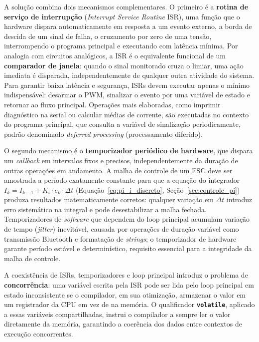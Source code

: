 A solução combina dois mecanismos complementares. O primeiro é a \textbf{rotina de serviço de interrupção} (\textit{Interrupt Service Routine} ISR), uma função que o hardware dispara automaticamente em resposta a um evento externo, a borda de descida de um sinal de falha, o cruzamento por zero de uma tensão, interrompendo o programa principal e executando com latência mínima. Por analogia com circuitos analógicos, a ISR é o equivalente funcional de um \textbf{comparador de janela}: quando o sinal monitorado cruza o limiar, uma ação imediata é disparada, independentemente de qualquer outra atividade do sistema. Para garantir baixa latência e segurança, ISRs devem executar apenas o mínimo indispensável: desarmar o PWM, sinalizar o evento por uma variável de estado e retornar ao fluxo principal. Operações mais elaboradas, como imprimir diagnóstico na serial ou calcular médias de corrente, são executadas no contexto do programa principal, que consulta a variável de sinalização periodicamente, padrão denominado \textit{deferred processing} (processamento diferido).

O segundo mecanismo é o \textbf{temporizador periódico de hardware}, que dispara um \textit{callback} em intervalos fixos e precisos, independentemente da duração de outras operações em andamento. A malha de controle de um ESC deve ser amostrada a período exatamente constante para que a equação do integrador $I_k = I_{k-1} + K_i \cdot e_k \cdot \Delta t$ (Equação~\ref{eq:pi_i_discreto}, Seção~\ref{sec:controle_pi}) produza resultados matematicamente corretos: qualquer variação em $\Delta t$ introduz erro sistemático na integral e pode desestabilizar a malha fechada. Temporizadores de \textit{software} que dependem do loop principal acumulam variação de tempo (\textit{jitter}) inevitável, causada por operações de duração variável como transmissão Bluetooth e formatação de \textit{strings}; o temporizador de hardware garante período estável e determinístico, requisito essencial para a integridade da malha de controle.

A coexistência de ISRs, temporizadores e loop principal introduz o problema de \textbf{concorrência}: uma variável escrita pela ISR pode ser lida pelo loop principal em estado inconsistente se o compilador, em sua otimização, armazenar o valor em um registrador da CPU em vez de na memória. O qualificador \textbf{\texttt{volatile}}, aplicado a essas variáveis compartilhadas, instrui o compilador a sempre ler o valor diretamente da memória, garantindo a coerência dos dados entre contextos de execução concorrentes.

